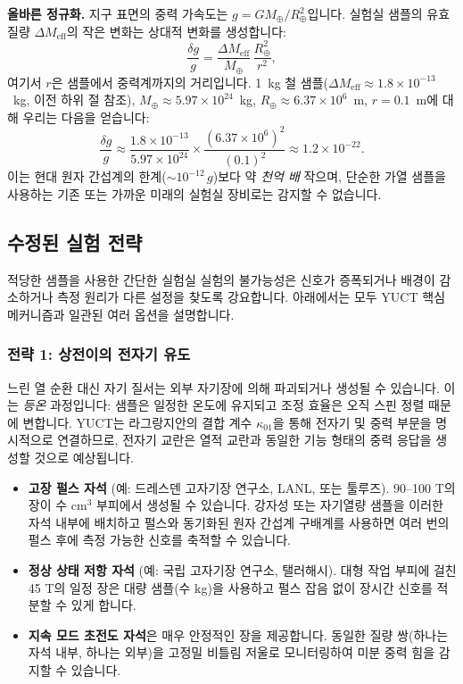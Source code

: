 \documentclass[11pt,a4paper]{article}
\begin{document}
	\textbf{올바른 정규화.} 지구 표면의 중력 가속도는 $g = G M_\oplus / R_\oplus^2$입니다. 실험실 샘플의 유효 질량 $\Delta M_{\mathrm{eff}}$의 작은 변화는 상대적 변화를 생성합니다:
	\begin{equation}
		\frac{\delta g}{g} = \frac{\Delta M_{\mathrm{eff}}}{M_\oplus}\,
		\frac{R_\oplus^2}{r^2},
		\label{eq:delta-g-correct}
	\end{equation}
	여기서 $r$은 샘플에서 중력계까지의 거리입니다. 1~kg 철 샘플($\Delta M_{\mathrm{eff}} \approx 1.8\times10^{-13}$~kg, 이전 하위 절 참조), $M_\oplus \approx 5.97\times10^{24}$~kg, $R_\oplus \approx 6.37\times10^{6}$~m, $r = 0.1$~m에 대해 우리는 다음을 얻습니다:
	\[
	\frac{\delta g}{g} \approx
	\frac{1.8\times10^{-13}}{5.97\times10^{24}} \times
	\frac{(6.37\times10^{6})^2}{(0.1)^2}
	\approx 1.2\times10^{-22}.
	\]
	이는 현대 원자 간섭계의 한계($\sim 10^{-12}\,g$)보다 약 \emph{천억 배} 작으며, 단순한 가열 샘플을 사용하는 기존 또는 가까운 미래의 실험실 장비로는 감지할 수 없습니다.
	
	\subsection{수정된 실험 전략}
	\label{subsec:lab-revised}
	
	적당한 샘플을 사용한 간단한 실험실 실험의 불가능성은 신호가 증폭되거나 배경이 감소하거나 측정 원리가 다른 설정을 찾도록 강요합니다. 아래에서는 모두 YUCT 핵심 메커니즘과 일관된 여러 옵션을 설명합니다.
	
	\subsubsection*{전략 1: 상전이의 전자기 유도}
	느린 열 순환 대신 자기 질서는 외부 자기장에 의해 파괴되거나 생성될 수 있습니다. 이는 \emph{등온} 과정입니다: 샘플은 일정한 온도에 유지되고 조정 효율은 오직 스핀 정렬 때문에 변합니다. YUCT는 라그랑지안의 결합 계수 $\kappa_{01}$을 통해 전자기 및 중력 부문을 명시적으로 연결하므로, 전자기 교란은 열적 교란과 동일한 기능 형태의 중력 응답을 생성할 것으로 예상됩니다.
	
	\begin{itemize}
		\item \textbf{고장 펄스 자석} (예: 드레스덴 고자기장 연구소, LANL, 또는 툴루즈). 90–100 T의 장이 수 cm$^3$ 부피에서 생성될 수 있습니다. 강자성 또는 자기열량 샘플을 이러한 자석 내부에 배치하고 펄스와 동기화된 원자 간섭계 구배계를 사용하면 여러 번의 펄스 후에 측정 가능한 신호를 축적할 수 있습니다.
		\item \textbf{정상 상태 저항 자석} (예: 국립 고자기장 연구소, 탤러해시). 대형 작업 부피에 걸친 45 T의 일정 장은 대량 샘플(수 kg)을 사용하고 펄스 잡음 없이 장시간 신호를 적분할 수 있게 합니다.
		\item \textbf{지속 모드 초전도 자석}은 매우 안정적인 장을 제공합니다. 동일한 질량 쌍(하나는 자석 내부, 하나는 외부)을 고정밀 비틀림 저울로 모니터링하여 미분 중력 힘을 감지할 수 있습니다.
	\end{itemize}
	
\end{document}
